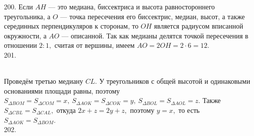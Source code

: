 \documentclass[12pt]{article}
\begin{document}
200. Если $AH$ --- это медиана, биссектриса и высота равностороннего треугольника, а $O$ --- точка пересечения его биссектрис, медиан, высот, а также серединных перпендикуляров к сторонам, то $OH$ является радиусом вписанной окружности, а $AO$ --- описанной. Так как медианы делятся точкой пересечения в отношении $2:1,$ считая от вершины, имеем $AO=2OH=2\cdot6=12.$\\
201. \begin{figure}[ht!]
\end{figure}\\
Проведём третью медиану $CL.$ У треугольников с общей высотой и одинаковыми основаниями площади равны, поэтому $S_{\Delta BOM}=S_{\Delta COM}=x,\
S_{\Delta AOK}=S_{\Delta COK}=y,\ S_{\Delta BOL}=S_{\Delta AOL}=z.$ Также $S_{\Delta CBL}=S_{\Delta CAL},$ откуда $2x+z=2y+z,$ поэтому $y=x,$ то есть $S_{\Delta AOK}=S_{\Delta BOM}.$\\
202. \begin{figure}[ht!]
\end{figure}\\
\end{document}
